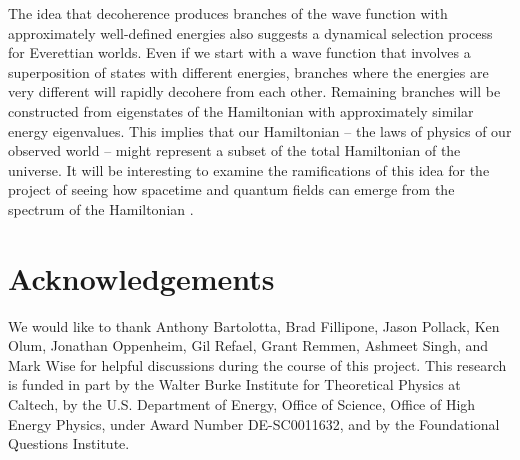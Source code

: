 \documentclass[12pt,aps,prd,onecolumn,nofootinbib,notitlepage]{revtex4-1}
\begin{document}
The idea that decoherence produces branches of the wave function with approximately well-defined energies also suggests a dynamical selection process for Everettian worlds.
Even if we start with a wave function that involves a superposition of states with different energies, branches where the energies are very different will rapidly decohere from each other.
Remaining branches will be constructed from eigenstates of the Hamiltonian with approximately similar energy eigenvalues.
This implies that our Hamiltonian -- the laws of physics of our observed world -- might represent a subset of the total Hamiltonian of the universe.
It will be interesting to examine the ramifications of this idea for the project of seeing how spacetime and quantum fields can emerge from the spectrum of the Hamiltonian \cite{Cao:2016mst,Cao:2017hrv,Cotler:2017abq,Carroll:2018rhc,Carroll:2021aiq}.



\section*{Acknowledgements}
We would like to thank Anthony Bartolotta, Brad Fillipone, Jason Pollack, Ken Olum, Jonathan Oppenheim, Gil Refael, Grant Remmen, Ashmeet Singh, and Mark Wise for helpful discussions during the course of this project. This research is funded in part by the Walter Burke Institute for Theoretical Physics at Caltech, by the U.S. Department of Energy, Office of Science, Office of High Energy Physics, under Award Number DE-SC0011632, and by the Foundational Questions Institute.




\end{document}
